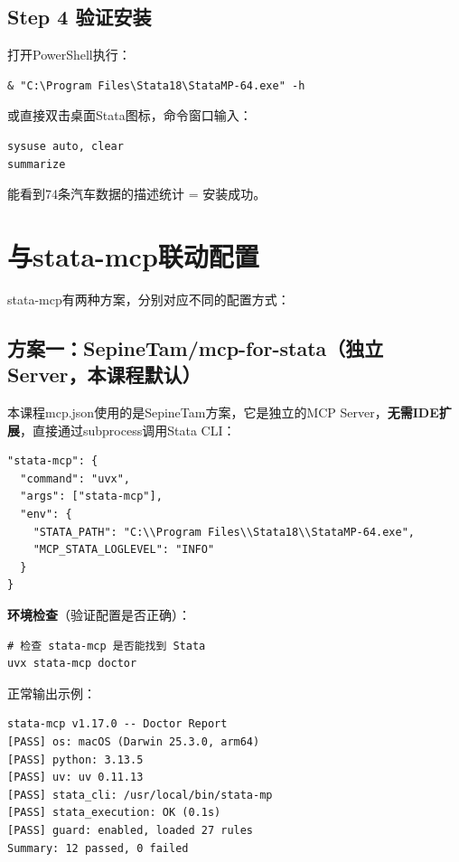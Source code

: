 \subsection{Step 4 验证安装}

打开PowerShell执行：

\begin{lstlisting}[style=shell]
& "C:\Program Files\Stata18\StataMP-64.exe" -h
\end{lstlisting}

或直接双击桌面Stata图标，命令窗口输入：

\begin{lstlisting}[style=stata]
sysuse auto, clear
summarize
\end{lstlisting}

能看到74条汽车数据的描述统计 = 安装成功。

\section{与stata-mcp联动配置}

stata-mcp有两种方案，分别对应不同的配置方式：

\subsection{方案一：SepineTam/mcp-for-stata（独立Server，本课程默认）}

本课程mcp.json使用的是SepineTam方案，它是独立的MCP Server，\textbf{无需IDE扩展}，直接通过subprocess调用Stata CLI：

\begin{lstlisting}[style=json]
"stata-mcp": {
  "command": "uvx",
  "args": ["stata-mcp"],
  "env": {
    "STATA_PATH": "C:\\Program Files\\Stata18\\StataMP-64.exe",
    "MCP_STATA_LOGLEVEL": "INFO"
  }
}
\end{lstlisting}

\textbf{环境检查}（验证配置是否正确）：

\begin{lstlisting}[style=shell]
# 检查 stata-mcp 是否能找到 Stata
uvx stata-mcp doctor
\end{lstlisting}

正常输出示例：
\begin{lstlisting}
stata-mcp v1.17.0 -- Doctor Report
[PASS] os: macOS (Darwin 25.3.0, arm64)
[PASS] python: 3.13.5
[PASS] uv: uv 0.11.13
[PASS] stata_cli: /usr/local/bin/stata-mp
[PASS] stata_execution: OK (0.1s)
[PASS] guard: enabled, loaded 27 rules
Summary: 12 passed, 0 failed
\end{lstlisting}

